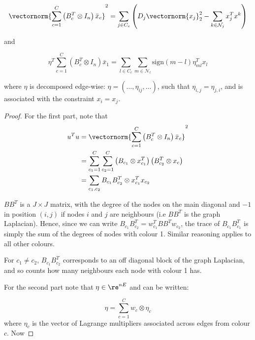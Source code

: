 \begin{lemma}
\begin{equation}
\vectornorm{\sum_{c=1}^C\left(B_c^T \otimes I_n\right)\bar{x}_c}^2 = \sum_{j \in C_c}\left( D_j\vectornorm{x_j}_2^2 - \sum_{k \in \mathcal{N}_j} x_j^Tx^k\right)
\end{equation}

and

\begin{equation}
\eta^T\sum_{c=1}^C\left(B_c^T \otimes I_n\right)\bar{x}_1 = \sum_{l\in C_c} \sum_{m\in \mathcal{N}_l}\mathrm{sign}\left(m-l\right)\eta_{ml}^T x_l
\end{equation}

where \(\eta\) is decomposed edge-wise: \(\eta = \left(\ldots, \eta_{ij},\ldots\right)\), such that \(\eta_{i,j} = \eta_{j,i}\), and is associated with the constraint \(x_i = x_j\).


\begin{proof}
For the first part, note that 
\begin{align*}
u^Tu &= \vectornorm{\sum_{c=1}^C\left(B_c^T \otimes I_n\right)\bar{x}_c}^2 
\\ &=\sum	_{c_1=1}^C \sum	_{c_2=1}^C  \left(B_{c_1} \otimes x_{c_1}^T\right) \left(B_{c_2}^T \otimes x_c\right) \\
&= \sum_{c_1, c_2} B_{c_1}B_{c_2}^T \otimes x_{c_1}^Tx_{c_2}
\end{align*}

\(BB^T\) is a \(J \times J\) matrix, with the degree of the nodes on the main diagonal and \(-1\) in position \(\left(i,j\right)\) if nodes \(i\) and \(j\) are neighbours (i.e \(BB^T\) is the graph Laplacian). Hence, since we can write \(B_{c_1}B_{c_2}^T = w_{c_1}^TBB^Tw_{c_2}\), the trace of \(B_{c_1}B_{c_1}^T\) is simply the sum of the degrees of nodes with colour 1. Similar reasoning applies to all other colours.

For \(c_1 \neq c_2\),  \(B_{c_1}B_{c_2}^T\) corresponds to an off diagonal block of the graph Laplacian, and so counts how many neighbours each node with colour 1 has.

For the second part note that \(\eta \in \re^{nE}\) and can be written:

\begin{equation}
\eta = \sum_{c=1}^C w_c \otimes \eta_c
\end{equation}
where \(\eta_c\) is the vector of Lagrange multipliers associated across edges from colour \(c\). Now


\end{proof}
\end{lemma}
